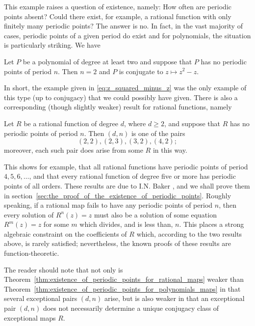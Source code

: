 This example raises a question of existence, namely: How often are periodic
points absent? Could there exist, for example, a rational function with only
finitely many periodic points? The answer is no. In fact, in the vast majority
of cases, periodic points of a given period do exist and for polynomials, the
situation is particularly striking. We have

\begin{theorem}
    \label{thm:existence_of_periodic_points_for_polynomials_maps}
    Let $P$ be a polynomial of degree at least two and suppose that $P$ has no
    periodic points of period $n$. Then $n = 2$ and $P$ is conjugate to $z
    \mapsto z^2 - z$.
\end{theorem}

In short, the example given in \eqref{eq:z_squared_minus_z} was the only example
of this type (up to conjugacy) that we could possibly have given. There is also
a corresponding (though slightly weaker) result for rational functions, namely

\begin{theorem}
    \label{thm:existence_of_periodic_points_for_rational_maps}
    Let $R$ be a rational function of degree $d$, where $d \geq 2$, and suppose
    that $R$ has no periodic points of period $n$. Then $(d, n)$ is one of the
    pairs
    \begin{equation*}
        (2, 2), (2, 3), (3, 2), (4, 2);
    \end{equation*}
    moreover, each such pair does arise from some $R$ in this way.
\end{theorem}

This shows for example, that all rational functions have periodic points of
period $4, 5, 6, \dots$, and that every rational function of degree five or more
has periodic points of all orders. These results are due to I.N. Baker
\cite{Baker1964}, and we shall prove them in
section~\ref{sec:the_proof_of_the_existence_of_periodic_points}. Roughly
speaking, if a rational map fails to have any periodic points of period $n$,
then every solution of $R^n(z) = z$ must also be a solution of some equation
$R^m(z) = z$ for some $m$ which divides, and is less than, $n$. This places a
strong algebraic constraint on the coefficients of $R$ which, according to the
two results above, is rarely satisfied; nevertheless, the known proofs of these
results are function-theoretic.

The reader should note that not only is
Theorem~\ref{thm:existence_of_periodic_points_for_rational_maps} weaker than
Theorem~\ref{thm:existence_of_periodic_points_for_polynomials_maps} in that
several exceptional pairs $(d, n)$ arise, but is also weaker in that an
exceptional pair $(d, n)$ does not necessarily determine a unique conjugacy
class of exceptional maps $R$.

